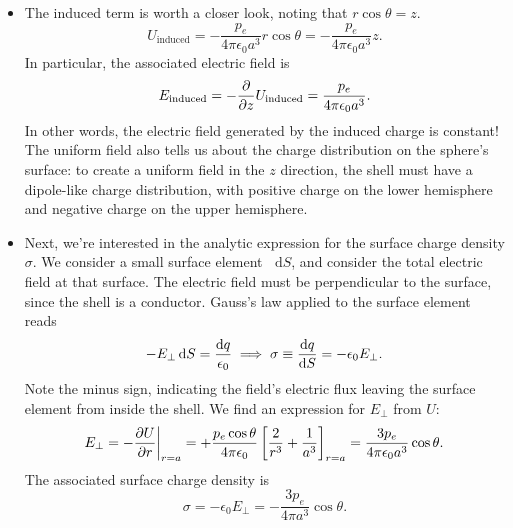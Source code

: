 \documentclass[11pt, a4paper]{article}
\newcommand{\diff}{\mathop{}\!\mathrm{d}} %
\newcommand{\ee}{\epsilon_{0}}  %
\begin{document}
\begin{itemize}
	\item The induced term is worth a closer look, noting that $ r\cos \theta = z $. 
	\begin{equation*}
		U_{\text{induced}} = -\frac{p_{e}}{4\pi \ee a^{3}}r\cos \theta = -\frac{p_{e}}{4\pi \ee a^{3}}z.
	\end{equation*}
	In particular, the associated electric field is
	\begin{equation*}
		E_{\text{induced}} = -\pdv{z}U_{\text{induced}} = \frac{p_{e}}{4\pi \ee a^{3}}.
	\end{equation*}
	In other words, the electric field generated by the induced charge is constant! The uniform field also tells us about the charge distribution on the sphere's surface: to create a uniform field in the $ z $ direction, the shell must have a dipole-like charge distribution, with positive charge on the lower hemisphere and negative charge on the upper hemisphere. 
	
	\item Next, we're interested in the analytic expression for the surface charge density $ \sigma $. We consider a small surface element $ \diff S $, and consider the total electric field at that surface. The electric field must be perpendicular to the surface, since the shell is a conductor. Gauss's law applied to the surface element reads
	\begin{equation*}
		- E_{\perp} \diff S = \frac{\diff q}{\ee} \implies \sigma \equiv \dv{q}{S} = -\ee E_{\perp}.
	\end{equation*}
	Note the minus sign, indicating the field's electric flux leaving the surface element from inside the shell. We find an expression for $ E_{\perp} $ from $ U $:
	\begin{equation*}
		E_{\perp} = -\pdv{U}{r}\bigg|_{r = a} = + \frac{p_{e}\cos \theta}{4\pi \ee}\left[\frac{2}{r^{3}} + \frac{1}{a^{3}}\right]_{r = a} = \frac{3p_{e}}{4\pi \ee a^{3}} \cos \theta.
	\end{equation*}
	The associated surface charge density is
	\begin{equation*}
		\sigma = -\ee E_{\perp} = -\frac{3p_{e}}{4\pi a^{3}} \cos \theta.
	\end{equation*}
	
	
\end{itemize}
\end{document}
